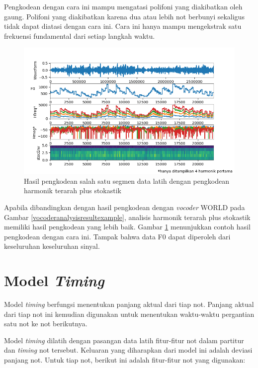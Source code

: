 Pengkodean dengan cara ini mampu mengatasi polifoni yang diakibatkan oleh gaung. Polifoni yang diakibatkan karena dua atau lebih not berbunyi sekaligus tidak dapat diatasi dengan cara ini. Cara ini hanya mampu mengekstrak satu frekuensi fundamental dari setiap langkah waktu.

\begin{figure}[h]
    \centering
    \includegraphics[width=\textwidth]{resources/Analisis_guidedtwmhps.png}
    \caption{Hasil pengkodean salah satu segmen data latih dengan pengkodean harmonik terarah plus stokastik} \label{guidedtwmhpsanalysisresultexample}
\end{figure}

Apabila dibandingkan dengan hasil pengkodean dengan \textit{vocoder} WORLD pada Gambar \ref{vocoderanalysisresultexample}, analisis harmonik terarah plus stokastik memiliki hasil pengkodean yang lebih baik. Gambar \ref{guidedtwmhpsanalysisresultexample} menunjukkan contoh hasil pengkodean dengan cara ini. Tampak bahwa data F0 dapat diperoleh dari keseluruhan keseluruhan sinyal.

\section{Model \textit{Timing}}

Model \textit{timing} berfungsi menentukan panjang aktual dari tiap not. Panjang aktual dari tiap not ini kemudian digunakan untuk menentukan waktu-waktu pergantian satu not ke not berikutnya.

Model \textit{timing} dilatih dengan pasangan data latih fitur-fitur not dalam partitur dan \textit{timing} not tersebut. Keluaran yang diharapkan dari model ini adalah deviasi panjang not. Untuk tiap not, berikut ini adalah fitur-fitur not yang digunakan:

